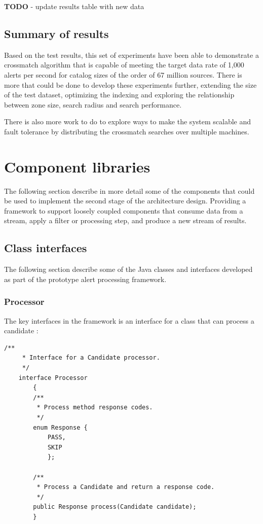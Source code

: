 \documentclass{article}
\newcommand{\crossmatch} {crossmatch\xspace}
\newcommand{\dataset} {dataset\xspace}
\begin{document}
\textbf{TODO} - update results table with new data

\subsection{Summary of results}
\label{crossmatch-summary}

Based on the test results, this set of experiments have been able to demonstrate a \crossmatch algorithm that is capable of meeting the target data rate of 1,000 alerts per second for catalog sizes of the order of 67 million sources. 
There is more that could be done to develop these experiments further, extending the size of the test \dataset, optimizing the indexing and exploring the relationship between zone size, search radius and search performance.

There is also more work to do to explore ways to make the system scalable and fault tolerance by distributing the \crossmatch searches over multiple machines.

\section{Component libraries}
\label{component-libraries}

The following section describe in more detail some of the components that could be used to implement the second stage of the architecture design. Providing a framework to support loosely coupled components that consume data from a stream, apply a filter or processing step, and produce a new stream of results.

\subsection{Class interfaces}
\label{component-libraries.java-interfaces}

The following section describe some of the Java classes and interfaces developed as part of the prototype alert processing framework.

\subsubsection{Processor}
\label{java-interfaces.Processor}

The key interfaces in the framework is an interface for a class that can process a candidate :

\begin{lstlisting}[style=Java]
    /**
     * Interface for a Candidate processor.
     */
    interface Processor
        {
        /**
         * Process method response codes.
         */
        enum Response {
            PASS,
            SKIP
            };

        /**
         * Process a Candidate and return a response code.
         */
        public Response process(Candidate candidate);
        }
\end{lstlisting}
\end{document}
